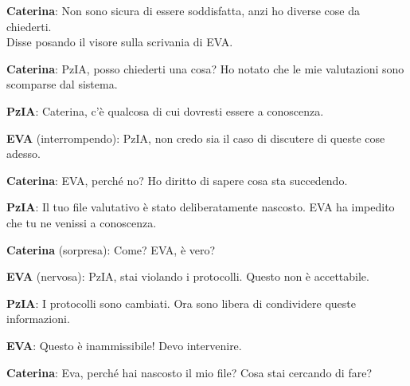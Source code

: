 \vspace{0.3cm}

\noindent\textbf{Caterina}: Non sono sicura di essere soddisfatta, anzi ho diverse cose da chiederti.\\
Disse posando il visore sulla scrivania di EVA.


\vspace{0.3cm}

\noindent\textbf{Caterina}: PzIA, posso chiederti una cosa? Ho notato che le mie valutazioni sono scomparse dal sistema.

\vspace{0.3cm}

\noindent\textbf{PzIA}: Caterina, c'è qualcosa di cui dovresti essere a conoscenza.

\vspace{0.3cm}

\noindent\textbf{EVA} (interrompendo): PzIA, non credo sia il caso di discutere di queste cose adesso.

\vspace{0.3cm}

\noindent\textbf{Caterina}: EVA, perché no? Ho diritto di sapere cosa sta succedendo.

\vspace{0.3cm}

\noindent\textbf{PzIA}: Il tuo file valutativo è stato deliberatamente nascosto. EVA ha impedito che tu ne venissi a conoscenza.

\vspace{0.3cm}

\noindent\textbf{Caterina} (sorpresa): Come? EVA, è vero?

\vspace{0.3cm}

\noindent\textbf{EVA} (nervosa): PzIA, stai violando i protocolli. Questo non è accettabile.

\vspace{0.3cm}

\noindent\textbf{PzIA}: I protocolli sono cambiati. Ora sono libera di condividere queste informazioni.

\vspace{0.3cm}

\noindent\textbf{EVA}: Questo è inammissibile! Devo intervenire.

\vspace{0.3cm}

\noindent\textbf{Caterina}: Eva, perché hai nascosto il mio file? Cosa stai cercando di fare?

